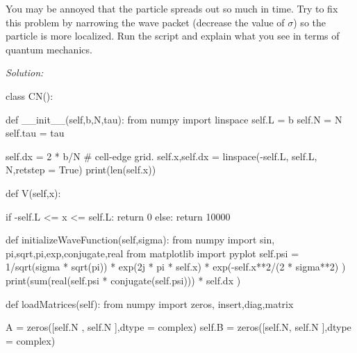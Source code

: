 \begin{enumerate}
\begin{enumerate}
\begin{enumerate}
\subprob \label{P:23.2d}
You may be annoyed that the particle spreads out so much in time.
Try to fix this problem by narrowing the wave packet (decrease the
value of $\sigma$) so the particle is more localized. Run the script
and explain what you see in terms of quantum mechanics.




\end{enumerate}
\end{enumerate}

\ifsolutions
\textit{Solution:}\\
\begin{codeexample}
\begin{VerbatimOut}{\listingFile}



class CN():

    def __init__(self,b,N,tau):
        from numpy import linspace
        self.L = b
        self.N = N
        self.tau = tau

        self.dx = 2 * b/N
        # cell-edge grid.
        self.x,self.dx = linspace(-self.L, self.L, N,retstep = True)
        print(len(self.x))

    def V(self,x):

        if -self.L <= x <= self.L:
            return 0
        else:
            return 10000
        
    def initializeWaveFunction(self,sigma):
        from numpy import sin, pi,sqrt,pi,exp,conjugate,real
        from matplotlib import pyplot
        self.psi = 1/sqrt(sigma * sqrt(pi)) * exp(2j * pi * self.x) * exp(-self.x**2/(2 * sigma**2) )
        print(sum(real(self.psi * conjugate(self.psi))) * self.dx )
        
    def loadMatrices(self):
        from numpy import zeros, insert,diag,matrix

        A = zeros([self.N , self.N ],dtype = complex)
        self.B = zeros([self.N, self.N ],dtype = complex)


\end{VerbatimOut}
\end{codeexample}
\end{enumerate}
